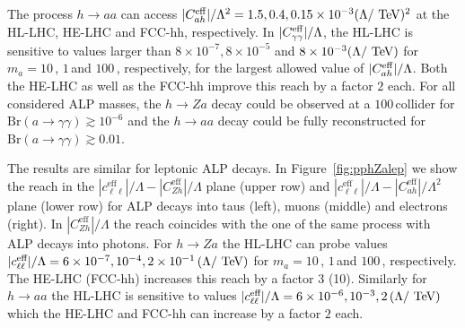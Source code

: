 The process $h \to aa$ can access $|C_{ah}^{\rm eff}|/\Lambda^2 = 1.5, 0.4, 0.15 \times 10^{-3} (\Lambda/\textrm{\ensuremath{~\text{TeV}}})^2$ at the HL-LHC, HE-LHC and FCC-hh, respectively. In $|C_{\gamma\gamma}^{\rm eff}|/\Lambda$, the HL-LHC is sensitive to values larger than $8 \times 10^{-7}, 8 \times 10^{-5}$ and $8 \times 10^{-3} (\Lambda/\textrm{\ensuremath{~\text{TeV}}})$ for $m_a = 10\,$\UGeV, $1\,$\UGeV and $100\,$\UMeV, respectively, for the largest allowed value of $|C_{ah}^{\rm eff}|/\Lambda$. Both the HE-LHC as well as the FCC-hh improve this reach by a factor $2$ each. For all considered ALP masses, the $h\to Z a$ decay could be observed at a $100\,$\UTeV collider for $\text{Br}(a\to \gamma\gamma)\gtrsim 10^{-6}$ and the $h\to a a$ decay could be fully reconstructed for $\text{Br}(a\to \gamma\gamma)\gtrsim 0.01$.

The results are similar for leptonic ALP decays. In Figure~\ref{fig:pphZalep} we show the reach in the $|c_{\ell\ell}^\text{eff}|/\Lambda - |C_{Zh}^\text{eff}|/\Lambda$ plane (upper row) and  $|c_{\ell\ell}^\text{eff}|/\Lambda - |C_{ah}^\text{eff}|/\Lambda^2$ plane (lower row) for ALP decays into taus (left), muons (middle) and electrons (right). In $|C_{Zh}^\text{eff}|/\Lambda$ the reach coincides with the one of the same process with ALP decays into photons. For $h \to Za$ the HL-LHC can probe values $|c_{\ell\ell}^\text{eff}|/\Lambda = 6 \times 10^{-7}, 10^{-4}, 2 \times 10^{-1}\,(\Lambda/\textrm{\ensuremath{~\text{TeV}}})$ for $m_a = 10\,$\UGeV, $1\,$\UGeV and $100\,$\UMeV, respectively. The HE-LHC (FCC-hh) increases this reach by a factor 3 (10). Similarly for $h \to aa$ the HL-LHC is sensitive to values $|c_{\ell\ell}^\text{eff}|/\Lambda = 6 \times 10^{-6}, 10^{-3}, 2 \,(\Lambda/\textrm{\ensuremath{~\text{TeV}}})$ which the HE-LHC and FCC-hh can increase by a factor $2$ each.
